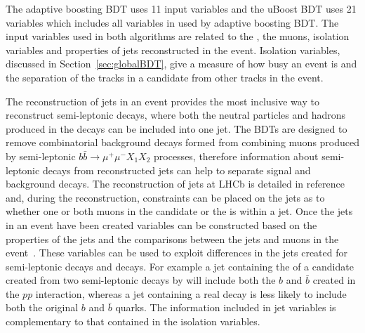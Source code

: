 The adaptive boosting BDT uses 11 input variables and the uBoost BDT uses 21 variables which includes all variables in used by adaptive boosting BDT.
The input variables used in both algorithms are related to the \bs, the muons, isolation variables and properties of jets reconstructed in the event. Isolation variables, discussed in Section~\ref{sec:globalBDT}, give a measure of how busy an event is and the separation of the tracks in a \bsmumu candidate from other tracks in the event. 

The reconstruction of jets in an event provides the most inclusive way to reconstruct semi-leptonic decays, where both the neutral particles and hadrons produced in the decays can be included into one jet. 
The BDTs are designed to remove combinatorial background decays formed from combining muons produced by semi-leptonic $b\bar{b} \to \mu^{+} \mu^{-} X_{1} X_{2}$ processes, therefore information about semi-leptonic decays from reconstructed jets can help to separate signal and background decays. 
The reconstruction of jets at LHCb is detailed in reference~\cite{Augusto:1499646, Barter:1970903} and, during the reconstruction, constraints can be placed on the jets as to whether one or both muons in the \bsmumu candidate or the \bs is within a jet. 
Once the jets in an event have been created variables can be constructed based on the properties of the jets and the comparisons between the jets and muons in the event~\cite{CidVidal:2025971}. These variables can be used to exploit differences in the jets created for semi-leptonic decays and \bsmumu decays. For example a jet containing the \bs of a \bsmumu candidate created from two semi-leptonic decays by \bbbarmumux will include both the $b$ and $\bar{b}$ created in the $pp$ interaction, whereas a jet containing a real \bsmumu decay is less likely to include both the original $b$ and $\bar{b}$ quarks. The information included in jet variables is complementary to that contained in the isolation variables.



